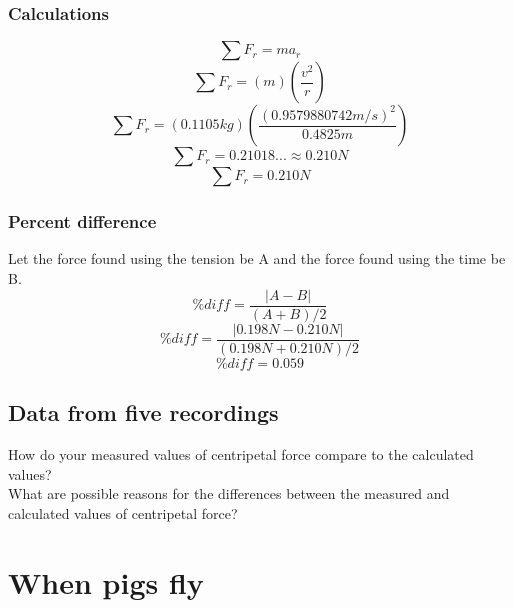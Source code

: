 \documentclass[11pt, letterpaper, includehead]{article}
\begin{document}
\subsubsection{Calculations}
$$\sum F_r = ma_r$$
$$\sum F_r = (m)\left( \frac{v^2}{r}\right)$$
$$\sum F_r = (0.1105 kg)\left( \frac{(0.9579880742m/s)^2}{0.4825 m}\right)$$
$$\sum F_r = 0.21018...\approx 0.210N$$
$$\boxed{\sum F_r = 0.210N}$$

\subsubsection{Percent difference}
Let the force found using the tension be A and the force found using the time be B.
$$\%diff = \frac{|A - B|}{(A + B)/2}$$
$$\%diff = \frac{|0.198N - 0.210N|}{(0.198N + 0.210N)/2}$$
$$\%diff = 0.059$$

\subsection{Data from five recordings}

How do your measured values of centripetal force compare to the calculated
values?\\
What are possible reasons for the differences between the measured and
calculated values of centripetal force? \\

\section{When pigs fly}
\end{document}
